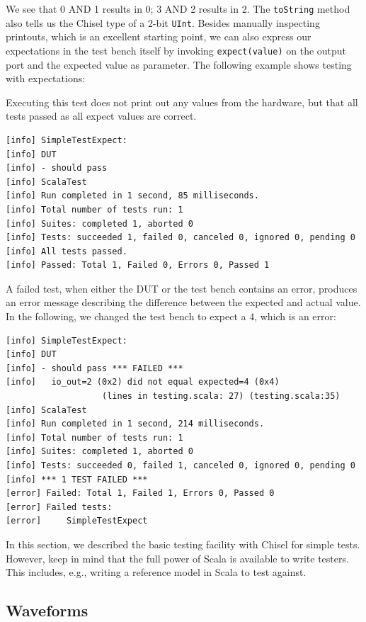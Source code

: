 \documentclass[%
    10pt,
    headinclude, footexclude,
    openright, %
    notitlepage,
    cleardoubleempty,
    headsepline,
    pointlessnumbers,
    bibtotoc, idxtotoc,
    ]{scrbook}
\newcommand{\code}[1]{{\small{\texttt{#1}}}}
\begin{document}
We see that 0 AND 1 results in 0; 3 AND 2 results in 2.
The \code{toString} method also tells us the Chisel type of a 2-bit \code{UInt}.
Besides manually inspecting printouts, which is an excellent starting point, we can also
express our expectations in the test bench itself by invoking
\code{expect(value)} on the output port and the expected value as parameter.
The following example shows testing with expectations:


Executing this test does not print out any values from the hardware,
but that all tests passed as all expect values are correct.

\begin{verbatim}
[info] SimpleTestExpect:
[info] DUT
[info] - should pass
[info] ScalaTest
[info] Run completed in 1 second, 85 milliseconds.
[info] Total number of tests run: 1
[info] Suites: completed 1, aborted 0
[info] Tests: succeeded 1, failed 0, canceled 0, ignored 0, pending 0
[info] All tests passed.
[info] Passed: Total 1, Failed 0, Errors 0, Passed 1
\end{verbatim}

A failed test, when either the DUT or the test bench contains an error,
produces an error message describing the difference between the expected and actual
value. In the following, we changed the test bench to expect a 4, which is an error:

\begin{verbatim}
[info] SimpleTestExpect:
[info] DUT
[info] - should pass *** FAILED ***
[info]   io_out=2 (0x2) did not equal expected=4 (0x4) 
                   (lines in testing.scala: 27) (testing.scala:35)
[info] ScalaTest
[info] Run completed in 1 second, 214 milliseconds.
[info] Total number of tests run: 1
[info] Suites: completed 1, aborted 0
[info] Tests: succeeded 0, failed 1, canceled 0, ignored 0, pending 0
[info] *** 1 TEST FAILED ***
[error] Failed: Total 1, Failed 1, Errors 0, Passed 0
[error] Failed tests:
[error] 	SimpleTestExpect
\end{verbatim}

In this section, we described the basic testing facility with Chisel for simple tests.
However, keep in mind that the full power of Scala is available to write testers.
This includes, e.g., writing a reference model in Scala to test against.

\subsection{Waveforms}
\end{document}

